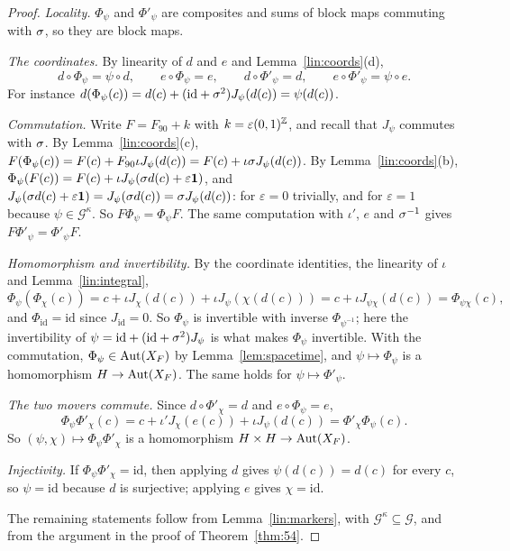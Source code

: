 \begin{proof}
\emph{Locality.} $\Phi_\psi$ and $\Phi'_\psi$ are composites and sums of block maps commuting with $\sigma$, so they are block maps.

\emph{The coordinates.} By linearity of $d$ and $e$ and Lemma~\ref{lin:coords}(d),
\[
d\circ\Phi_\psi=\psi\circ d,\qquad e\circ\Phi_\psi=e,\qquad d\circ\Phi'_\psi=d,\qquad e\circ\Phi'_\psi=\psi\circ e .
\]
For instance $d(\Phi_\psi(c))=d(c)+(\mathrm{id}+\sigma^2)J_\psi(d(c))=\psi(d(c))$.

\emph{Commutation.} Write $F=F_{90}+k$ with $k=\varepsilon(0,1)^{\mathbb{Z}}$, and recall that $J_\psi$ commutes with $\sigma$. By Lemma~\ref{lin:coords}(c), $F(\Phi_\psi(c))=F(c)+F_{90}\iota J_\psi(d(c))=F(c)+\iota\sigma J_\psi(d(c))$. By Lemma~\ref{lin:coords}(b), $\Phi_\psi(F(c))=F(c)+\iota J_\psi(\sigma d(c)+\varepsilon\mathbf 1)$, and $J_\psi(\sigma d(c)+\varepsilon\mathbf 1)=J_\psi(\sigma d(c))=\sigma J_\psi(d(c))$: for $\varepsilon=0$ trivially, and for $\varepsilon=1$ because $\psi\in\mathcal G^{\kappa}$. So $F\Phi_\psi=\Phi_\psi F$. The same computation with $\iota'$, $e$ and $\sigma^{-1}$ gives $F\Phi'_\psi=\Phi'_\psi F$.

\emph{Homomorphism and invertibility.} By the coordinate identities, the linearity of $\iota$ and Lemma~\ref{lin:integral},
\[
\Phi_\psi(\Phi_\chi(c))=c+\iota J_\chi(d(c))+\iota J_\psi(\chi(d(c)))=c+\iota J_{\psi\chi}(d(c))=\Phi_{\psi\chi}(c),
\]
and $\Phi_{\mathrm{id}}=\mathrm{id}$ since $J_{\mathrm{id}}=0$. So $\Phi_\psi$ is invertible with inverse $\Phi_{\psi^{-1}}$; here the invertibility of $\psi=\mathrm{id}+(\mathrm{id}+\sigma^2)J_\psi$ is what makes $\Phi_\psi$ invertible. With the commutation, $\Phi_\psi\in\operatorname{Aut}(X_F)$ by Lemma~\ref{lem:spacetime}, and $\psi\mapsto\Phi_\psi$ is a homomorphism $H\to\operatorname{Aut}(X_F)$. The same holds for $\psi\mapsto\Phi'_\psi$.

\emph{The two movers commute.} Since $d\circ\Phi'_\chi=d$ and $e\circ\Phi_\psi=e$,
\[
\Phi_\psi\Phi'_\chi(c)=c+\iota'J_\chi(e(c))+\iota J_\psi(d(c))=\Phi'_\chi\Phi_\psi(c).
\]
So $(\psi,\chi)\mapsto\Phi_\psi\Phi'_\chi$ is a homomorphism $H\times H\to\operatorname{Aut}(X_F)$.

\emph{Injectivity.} If $\Phi_\psi\Phi'_\chi=\mathrm{id}$, then applying $d$ gives $\psi(d(c))=d(c)$ for every $c$, so $\psi=\mathrm{id}$ because $d$ is surjective; applying $e$ gives $\chi=\mathrm{id}$.

The remaining statements follow from Lemma~\ref{lin:markers}, with $\mathcal G^{\kappa}\subseteq\mathcal G$, and from the argument in the proof of Theorem~\ref{thm:54}.
\end{proof}

